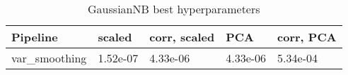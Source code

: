 \begin{table}[!htb]
\centering
\begin{tabular}{lllll}
\toprule
Pipeline & scaled & corr, scaled & PCA & corr, PCA \\
\midrule
var\_smoothing & 1.52e-07 & 4.33e-06 & 4.33e-06 & 5.34e-04 \\
\bottomrule
\end{tabular}
\caption{GaussianNB best hyperparameters}
\label{table-gaussiannb-params}
\end{table}
